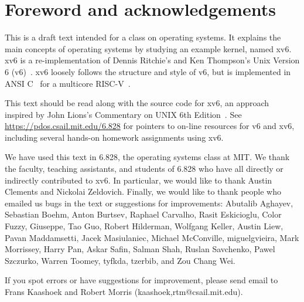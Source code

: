 \chapter*{Foreword and acknowledgements}


This is a draft text intended for a class on operating systems. It
explains the main concepts of operating systems by studying an example
kernel, named xv6.  xv6 is a re-implementation of Dennis Ritchie's and
Ken Thompson's Unix Version 6 (v6)~\cite{unix}.  xv6 loosely follows the structure
and style of v6, but is implemented in ANSI C~\cite{kernighan} for 
a multicore RISC-V~\cite{riscv}.

This text should be read along with the source code for xv6, an approach 
inspired by John Lions's Commentary on UNIX 6th Edition~\cite{lions}. See
\url{https://pdos.csail.mit.edu/6.828} for pointers to on-line
resources for v6 and xv6, including several hands-on homework assignments
using xv6.

We have used this text in 6.828, the operating systems class at MIT.
We thank the faculty, teaching assistants, and students of 6.828 who
have all directly or indirectly contributed to xv6.  In particular, we
would like to thank Austin Clements and Nickolai Zeldovich.  Finally,
we would like to thank people who emailed us bugs in the text or
suggestions for improvements: Abutalib Aghayev, Sebastian Boehm, Anton
Burtsev, Raphael Carvalho, Rasit Eskicioglu, Color Fuzzy, Giuseppe,
Tao Guo, Robert Hilderman, Wolfgang Keller, Austin Liew, Pavan
Maddamsetti, Jacek Masiulaniec, Michael McConville, miguelgvieira,
Mark Morrissey, Harry Pan, Askar Safin, Salman Shah, Ruslan Savchenko,
Pawel Szczurko, Warren Toomey, tyfkda, tzerbib, and Zou Chang Wei.

If you spot errors or have suggestions for improvement, please send email to
Frans Kaashoek and Robert Morris (kaashoek,rtm@csail.mit.edu).

